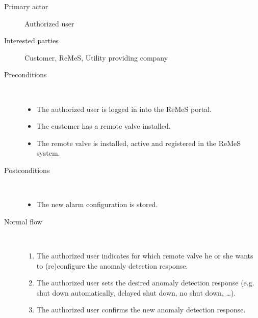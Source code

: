 \begin{description}
	\item[Primary actor] Authorized user
	\item[Interested parties] Customer, ReMeS, Utility providing company
	\item[Preconditions] \ 
	\begin{itemize}
		\item The authorized user is logged in into the ReMeS portal.
		\item The customer has a remote valve installed.
		\item The remote valve is installed, active and registered in the ReMeS
		system.
	\end{itemize}
	\item[Postconditions] \ 
	\begin{itemize}
		\item The new alarm configuration is stored.
	\end{itemize}
	\item[Normal flow] \ 
	\begin{enumerate}
	  	\item The authorized user indicates for which remote valve he or she wants
	  	to (re)configure the anomaly detection response.
	  	\item The authorized user sets the desired anomaly detection response
	  	(e.g. shut down automatically, delayed shut down, no shut down, \ldots).
	  	\item The authorized user confirms the new anomaly detection response.
	\end{enumerate}
\end{description}